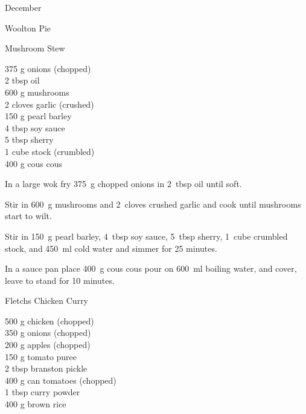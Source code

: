 \begin{menu}{December}
\begin{recipe}{2}{Woolton Pie}
\begin{instructions}
    \end{instructions}
    \end{recipe}%
  
    \begin{recipe}{2}{Mushroom Stew}%
		\begin{ingredients}
		375 g onions (chopped) \\
	2 tbsp oil  \\
	600 g mushrooms  \\
	2 cloves garlic (crushed) \\
	150 g pearl barley  \\
	4 tbsp soy sauce  \\
	5 tbsp sherry  \\
	1 cube stock (crumbled) \\
	400 g cous cous  \\
	
		\end{ingredients}
	
	
    \begin{instructions}
    \item 
        In a large wok fry
        375~g chopped onions
        in
        2~tbsp  oil
        until soft.
      \item 
        Stir in
        600~g  mushrooms
        and
        2~cloves crushed garlic
        and cook until mushrooms start to wilt.
      \item 
        Stir in
        150~g  pearl barley,
        4~tbsp  soy sauce,
        5~tbsp  sherry,
        1~cube crumbled stock,
        and
        450~ml  cold water
        and simmer for 25 minutes.
      \item 
      In a
      sauce pan 
      place
      400~g  cous cous
      pour on
      600~ml  boiling water,
      and cover, leave to stand for 10 minutes.
    
    \end{instructions}
    \end{recipe}%
  
    \begin{recipe}{2}{Fletchs Chicken Curry}%
		\begin{ingredients}
		500 g chicken (chopped) \\
	350 g onions (chopped) \\
	200 g apples (chopped) \\
	150 g tomato puree  \\
	2 tbsp branston pickle  \\
	400 g can tomatoes (chopped) \\
	1 tbsp curry powder  \\
	400 g brown rice  \\
	

\end{ingredients}
\end{recipe}
\end{menu}
